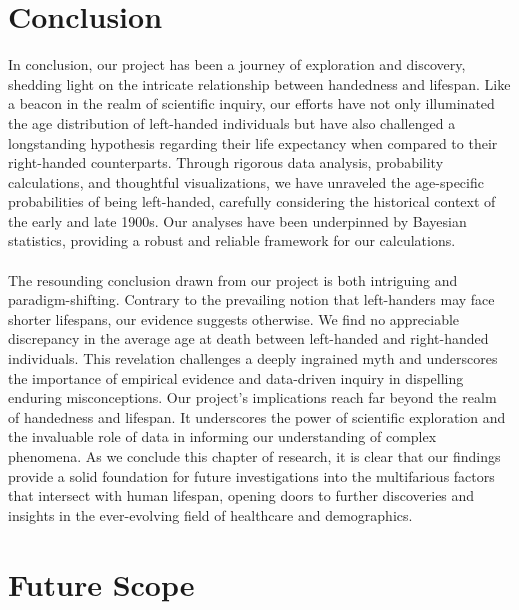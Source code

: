 \documentclass{article}
\begin{document}
\vspace{0.5cm}
\section{Conclusion}
In conclusion, our project has been a journey of exploration and discovery, shedding light on the intricate relationship between handedness and lifespan. Like a beacon in the realm of scientific inquiry, our efforts have not only illuminated the age distribution of left-handed individuals but have also challenged a longstanding hypothesis regarding their life expectancy when compared to their right-handed counterparts. Through rigorous data analysis, probability calculations, and thoughtful visualizations, we have unraveled the age-specific probabilities of being left-handed, carefully considering the historical context of the early and late 1900s. Our analyses have been underpinned by Bayesian statistics, providing a robust and reliable framework for our calculations.\\ \\The resounding conclusion drawn from our project is both intriguing and paradigm-shifting. Contrary to the prevailing notion that left-handers may face shorter lifespans, our evidence suggests otherwise. We find no appreciable discrepancy in the average age at death between left-handed and right-handed individuals. This revelation challenges a deeply ingrained myth and underscores the importance of empirical evidence and data-driven inquiry in dispelling enduring misconceptions. Our project's implications reach far beyond the realm of handedness and lifespan. It underscores the power of scientific exploration and the invaluable role of data in informing our understanding of complex phenomena. As we conclude this chapter of research, it is clear that our findings provide a solid foundation for future investigations into the multifarious factors that intersect with human lifespan, opening doors to further discoveries and insights in the ever-evolving field of healthcare and demographics. 

 

\vspace{0.5cm}
\section{Future Scope}
\end{document}
